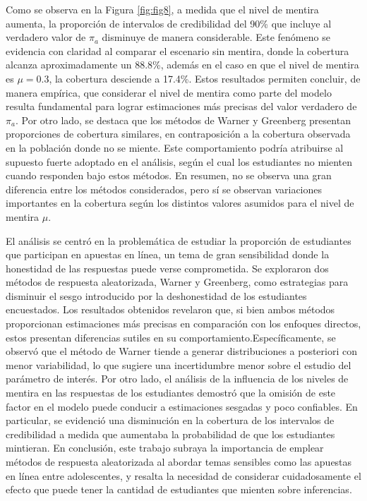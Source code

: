 \documentclass[
]{article}
\begin{document}
Como se observa en la Figura \ref{fig:fig8}, a medida que el nivel de mentira aumenta, la proporción de intervalos de credibilidad del 90\% que incluye al verdadero valor de \(\pi_a\) disminuye de manera considerable. Este fenómeno se evidencia con claridad al comparar el escenario sin mentira, donde la cobertura alcanza aproximadamente un 88.8\%, además en el caso en que el nivel de mentira es \(\mu=0.3\), la cobertura desciende a 17.4\%. Estos resultados permiten concluir, de manera empírica, que considerar el nivel de mentira como parte del modelo resulta fundamental para lograr estimaciones más precisas del valor verdadero de \(\pi_a\).
Por otro lado, se destaca que los métodos de Warner y Greenberg presentan proporciones de cobertura similares, en contraposición a la cobertura observada en la población donde no se miente. Este comportamiento podría atribuirse al supuesto fuerte adoptado en el análisis, según el cual los estudiantes no mienten cuando responden bajo estos métodos.
En resumen, no se observa una gran diferencia entre los métodos considerados, pero sí se observan variaciones importantes en la cobertura según los distintos valores asumidos para el nivel de mentira \(\mu\).

El análisis se centró en la problemática de estudiar la proporción de estudiantes que participan en apuestas en línea, un tema de gran sensibilidad donde la honestidad de las respuestas puede verse comprometida. Se exploraron dos métodos de respuesta aleatorizada, Warner y Greenberg, como estrategias para disminuir el sesgo introducido por la deshonestidad de los estudiantes encuestados. Los resultados obtenidos revelaron que, si bien ambos métodos proporcionan estimaciones más precisas en comparación con los enfoques directos, estos presentan diferencias sutiles en su comportamiento.Específicamente, se observó que el método de Warner tiende a generar distribuciones a posteriori con menor variabilidad, lo que sugiere una incertidumbre menor sobre el estudio del parámetro de interés.
Por otro lado, el análisis de la influencia de los niveles de mentira en las respuestas de los estudiantes demostró que la omisión de este factor en el modelo puede conducir a estimaciones sesgadas y poco confiables. En particular, se evidenció una disminución en la cobertura de los intervalos de credibilidad a medida que aumentaba la probabilidad de que los estudiantes mintieran. En conclusión, este trabajo subraya la importancia de emplear métodos de respuesta aleatorizada al abordar temas sensibles como las apuestas en línea entre adolescentes, y resalta la necesidad de considerar cuidadosamente el efecto que puede tener la cantidad de estudiantes que mienten sobre inferencias.
\end{document}

